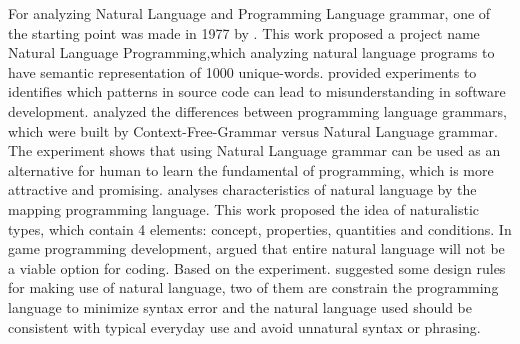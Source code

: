 \documentclass[english]{lipics-v2016}
\begin{document}
For analyzing Natural Language and Programming Language grammar, one of the starting point was made in 1977 by \cite{p1}. This work proposed  a project name Natural Language Programming,which analyzing natural language programs to have semantic representation of 1000 unique-words. \cite{p5} provided experiments to identifies which patterns in source code can lead to misunderstanding in software development. \cite{p12} analyzed the differences between programming language grammars, which were built by Context-Free-Grammar versus Natural Language grammar. The experiment shows that using Natural Language grammar can be used as an alternative for human to learn the fundamental of programming, which is more attractive and promising. \cite{p25} analyses characteristics of natural language by the mapping programming language. This work proposed the idea of naturalistic types, which contain 4 elements: concept, properties, quantities and conditions. In game programming development, \cite{p16} argued that entire natural language will not be a viable option for coding. Based on the experiment. \cite{p16} suggested some design rules for making use of natural language, two of them are constrain the programming language to minimize syntax error and the natural language used should be consistent with typical everyday use and avoid unnatural syntax or phrasing.
\end{document}
